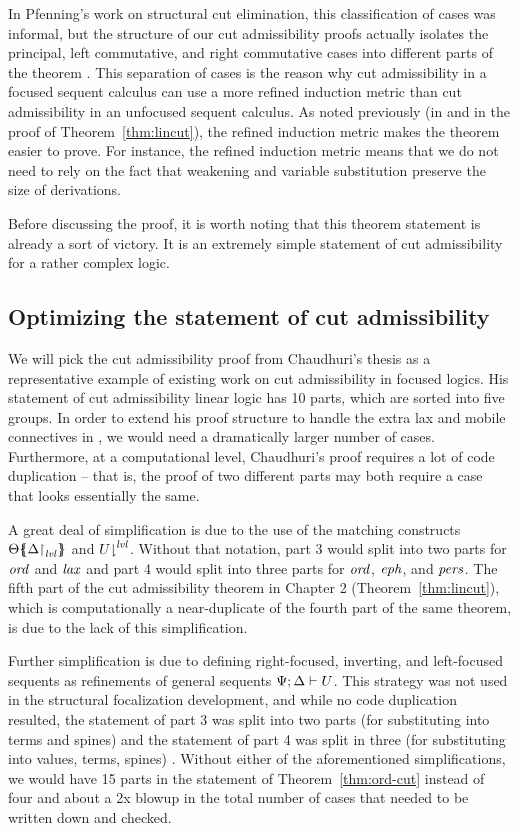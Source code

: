 In Pfenning's work on structural cut elimination, this classification
of cases was informal, but the structure of our cut admissibility
proofs actually isolates the principal, left commutative, and right
commutative cases into different parts of the theorem
\cite{pfenning00structural}. This separation of cases is the reason
why cut admissibility in a focused sequent calculus can use a more
refined induction metric than cut admissibility in an unfocused
sequent calculus. As noted previously (in \cite{simmons11structural}
and in the proof of Theorem~\ref{thm:lincut}), the
refined induction metric makes the theorem easier to prove.  For
instance, the refined induction metric means that we do not need to
rely on the fact that weakening and variable substitution preserve
the size of derivations.

Before discussing the proof, it is worth noting that this theorem
statement is already a sort of victory. It is an extremely simple
statement of cut admissibility for a rather complex logic.

\subsection{Optimizing the statement of cut admissibility}

We will pick the cut admissibility proof
from Chaudhuri's thesis \cite{chaudhuri06focused} as a representative
example of existing work on cut admissibility in focused logics.  His
statement of cut admissibility linear logic has 10 parts, 
which are sorted into
five groups. In order to extend his
proof structure to handle the extra lax and mobile connectives in
\ollll, we would need a dramatically larger number of
cases. Furthermore, at a computational level, Chaudhuri's proof
requires a lot of code duplication -- that is, the proof of two
different parts may both require a case that looks essentially the
same.

A great deal of simplification is due to the use of the matching
constructs ${\Theta}\mbox{$\{\hspace{-4pt}\{$}{\ensuremath{{\Delta}{\upharpoonright}_{{\it lvl}}}}\mbox{$\}\hspace{-4pt}\}$}$ and
${U}{\downharpoonright}^{{\it lvl}}$. Without that notation, part 3 would split
into two parts for ${\it ord}$ and ${\it lax}$ and part 4 would split into
three parts for ${\it ord}$, ${\it eph}$, and ${\it pers}$. The fifth part of
the cut admissibility theorem in Chapter 2
(Theorem~\ref{thm:lincut}), which is computationally a
near-duplicate of the fourth part of the same theorem, is due to the
lack of this simplification.

Further simplification is due to defining right-focused, inverting,
and left-focused sequents as refinements of general sequents
${\Psi};{\Delta} \vdash {U} \mathstrut$. This strategy was not used in the structural
focalization development, and while no code duplication resulted, the
statement of part 3 was split into two parts (for substituting into
terms and spines) and the statement of part 4 was split in three (for
substituting into values, terms, spines) \cite{simmons11structural}.
Without either of the aforementioned simplifications, we would have 15
parts in the statement of Theorem~\ref{thm:ord-cut} instead of four
and about a 2x blowup in the total number of cases that needed to be
written down and checked.

